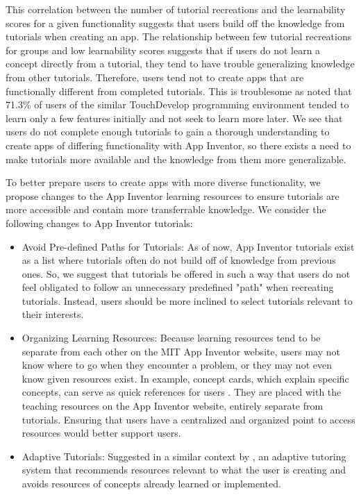 \documentclass[conference]{IEEEtran}
\begin{document}
This correlation between the number of tutorial recreations and the learnability scores for a given functionality suggests that users build off the knowledge from tutorials when creating an app. The relationship between few tutorial recreations for groups and low learnability scores suggests that if users do not learn a concept directly from a tutorial, they tend to have trouble generalizing knowledge from other tutorials. Therefore, users tend not to create apps that are functionally different from completed tutorials. This is troublesome as \cite{TouchDevelop:Li} noted that 71.3\% of users of the similar TouchDevelop programming environment tended to learn only a few features initially and not seek to learn more later. We see that users do not complete enough tutorials to gain a thorough understanding to create apps of differing functionality with App Inventor, so there exists a need to make tutorials more available and the knowledge from them more generalizable.

To better prepare users to create apps with more diverse functionality, we propose changes to the App Inventor learning resources to ensure tutorials are more accessible and contain more transferrable knowledge. We consider the following changes to App Inventor tutorials:
\begin{itemize}
	\item Avoid Pre-defined Paths for Tutorials: As of now, App Inventor tutorials exist as a list where tutorials often do not build off of knowledge from previous ones. So, we suggest that tutorials be offered in such a way that users do not feel obligated to follow an unnecessary predefined "path" when recreating tutorials. Instead, users should be more inclined to select tutorials relevant to their interests.
	\item Organizing Learning Resources: Because learning resources tend to be separate from each other on the MIT App Inventor website, users may not know where to go when they encounter a problem, or they may not even know given resources exist. In example, concept cards, which explain specific concepts, can serve as quick references for users \cite{concept_cards}. They are placed with the teaching resources on the App Inventor website, entirely separate from tutorials. Ensuring that users have a centralized and organized point to access resources would better support users.
	\item Adaptive Tutorials: Suggested in a similar context by \cite{TouchDevelop:Li}, an adaptive tutoring system that recommends resources relevant to what the user is creating and avoids resources of concepts already learned or implemented.

\end{itemize}
\end{document}
